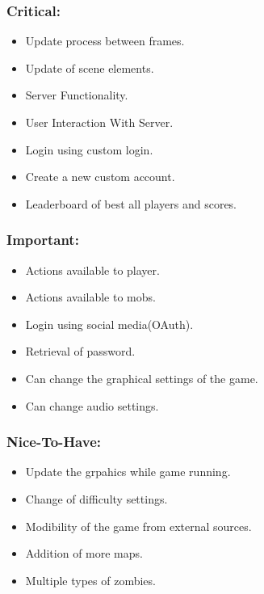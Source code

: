 \documentclass[letterpaper]{article}
\begin{document}
				\subsubsection*{Critical:}
				\vspace{0.1in}
					
					\begin{itemize}
						\item Update process between frames.
						\item Update of scene elements.
						\item Server Functionality.
						\item User Interaction With Server.
						\item Login using custom login.
						\item Create a new custom account.	
						\item Leaderboard of best all players and scores.					
					\end{itemize}	
					
				\vspace{0.2in}
				\subsubsection*{Important:}
				\vspace{0.2in}
				
					\begin{itemize}
						\item Actions available to player.
						\item Actions available to mobs.
						\item Login using social media(OAuth).
						\item Retrieval of password.
						\item Can change the graphical settings of the game.
						\item Can change audio settings.
					\end{itemize}
				
				\vspace{0.2in}
				\subsubsection*{Nice-To-Have:}
				\vspace{0.2in}
					\begin{itemize}
						\item Update the grpahics while game running.
						\item Change of difficulty settings.
						\item Modibility of the game from external sources.
						\item Addition of more maps.
						\item Multiple types of zombies.
					\end{itemize}
					
\end{document}
